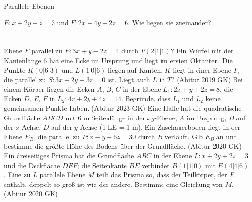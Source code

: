 \setcounter{aufgabe}{16}

\begin{aufgabe}{Parallele Ebenen}
\begin{teile}
\teil $E\colon x + 2y - z = 3$ und $F\colon 2x + 4y - 2z = 6$. Wie liegen sie zueinander? \\  \\  \\ 
\teil Ebene $F$ parallel zu $E\colon 3x + y - 2z = 4$ durch $P(2 | 1 | 1)$?
\teil Ein Würfel mit der Kantenlänge 6 hat eine Ecke im Ursprung und liegt im ersten Oktanten. Die Punkte $K(0 | 6 | 3)$ und $L(1 | 0 | 6)$ liegen auf Kanten. $K$ liegt in einer Ebene $T$, die parallel zu $S\colon 3x + 2y + 3z = 0$ ist. Liegt auch $L$ in $T$? \hfill (Abitur 2019 GK)
\teil Bei einem Körper liegen die Ecken $A$, $B$, $C$ in der Ebene $L_1\colon 2x + y + 2z = 8$, die Ecken $D$, $E$, $F$ in $L_2\colon 4x + 2y + 4z = 14$. Begründe, dass $L_1$ und $L_2$ keine gemeinsamen Punkte haben. \hfill (Abitur 2023 GK)
\teil Eine Halle hat die quadratische Grundfläche $ABCD$ mit 6 m Seitenlänge in der $xy$-Ebene, $A$ im Ursprung, $B$ auf der $x$-Achse, $D$ auf der $y$-Achse (1 LE = 1 m). Ein Zuschauerboden liegt in der Ebene $E_B$, die parallel zu $P\colon x - y + 6z = 30$ durch $B$ verläuft. Gib $E_B$ an und bestimme die größte Höhe des Bodens über der Grundfläche. \hfill (Abitur 2020 GK)
\teil Ein dreiseitiges Prisma hat die Grundfläche $ABC$ in der Ebene $L\colon x + 2y + 2z = 3$ und die Deckfläche $DEF$; die Seitenkante $BE$ verbindet $B(1 | 1 | 0)$ mit $E(4 | 4 | 6)$. Eine zu $L$ parallele Ebene $M$ teilt das Prisma so, dass der Teilkörper, der $E$ enthält, doppelt so groß ist wie der andere. Bestimme eine Gleichung von $M$. \hfill (Abitur 2020 GK)
\end{teile}
\end{aufgabe}

